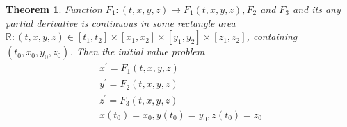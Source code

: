 \documentclass[a4paper,10pt]{article}
\newtheorem{theorem}{Theorem}[section]
\begin{document}
    \begin{theorem}
        Function $F_1: (t, x, y, z) \mapsto F_1(t, x, y,z), F_2$ and $F_3$ and its any partial derivative is continuous in some rectangle area $\mathbb{R}: (t, x, y, z) \in \left[ t_1, t_2 \right] \times \left[ x_1, x_2 \right] \times \left[ y_1, y_2 \right] \times \left[ z_1, z_2 \right]$, containing $(t_0, x_0, y_0, z_0)$. Then the initial value problem
        \begin{gather*}
            x^{\prime} = F_1(t, x, y, z) \\    
            y^{\prime} = F_2(t, x, y, z) \\ 
            z^{\prime} = F_3(t, x, y, z) \\ 
            x(t_0) = x_0, y(t_0) = y_0, z(t_0) = z_0
        \end{gather*}
    \end{theorem}
        
\end{document}
